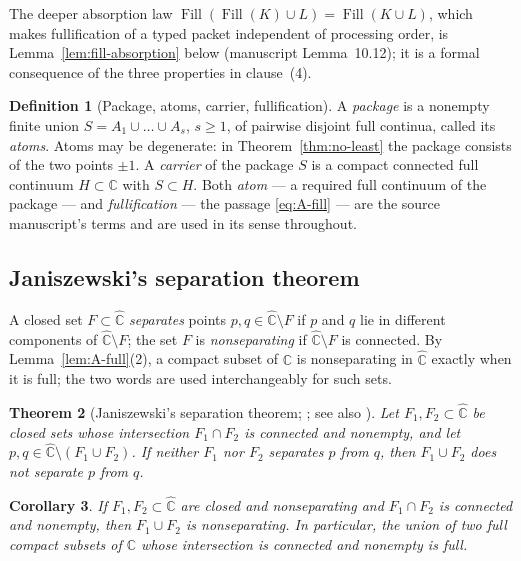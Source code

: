 \documentclass[11pt,reqno]{amsart}
\newtheorem{theorem}{Theorem}[section]
\newtheorem{corollary}[theorem]{Corollary}
\theoremstyle{definition}
\newtheorem{definition}[theorem]{Definition}
\theoremstyle{remark}
\newcommand{\C}{\mathbb C}
\newcommand{\Chat}{\widehat{\mathbb C}}
\newcommand{\Fill}{\operatorname{Fill}}
\begin{document}
The deeper absorption law
$\Fill(\Fill(K)\cup L)=\Fill(K\cup L)$, which makes fullification of a
typed packet independent of processing order, is
Lemma~\ref{lem:fill-absorption} below (manuscript Lemma~10.12); it is a
formal consequence of the three properties in clause~(4).

\begin{definition}[Package, atoms, carrier, fullification]
\label{def:A-package}
A \emph{package} is a nonempty finite union
$S=A_1\cup\dots\cup A_s$, $s\ge1$, of pairwise disjoint full continua,
called its \emph{atoms}.  Atoms may be
degenerate: in Theorem~\ref{thm:no-least} the package consists of the two
points $\pm1$.  A \emph{carrier} of the package $S$ is a compact
connected full continuum $H\subset\C$ with $S\subset H$.  Both
\emph{atom} --- a required full continuum of the package --- and
\emph{fullification} --- the passage \eqref{eq:A-fill} --- are the source
manuscript's terms \cite{MWman} and are used in its sense throughout.
\end{definition}

\subsection{Janiszewski's separation theorem}\label{subsec:A-janiszewski}

A closed set $F\subset\Chat$ \emph{separates} points
$p,q\in\Chat\setminus F$ if $p$ and $q$ lie in different components of
$\Chat\setminus F$; the set $F$ is \emph{nonseparating} if
$\Chat\setminus F$ is connected.  By Lemma~\ref{lem:A-full}(2), a compact
subset of $\C$ is nonseparating in $\Chat$ exactly when it is full; the
two words are used interchangeably for such sets.

\begin{theorem}[Janiszewski's separation theorem;
{\cite{Jan15}; see also \cite{New51,Why42}}]
\label{thm:A-janiszewski}
Let $F_1,F_2\subset\Chat$ be closed sets whose intersection
$F_1\cap F_2$ is connected and nonempty, and let
$p,q\in\Chat\setminus(F_1\cup F_2)$.  If neither $F_1$ nor $F_2$
separates $p$ from $q$, then $F_1\cup F_2$ does not separate $p$ from
$q$.
\end{theorem}

\begin{corollary}\label{cor:A-janiszewski}
If $F_1,F_2\subset\Chat$ are closed and nonseparating and
$F_1\cap F_2$ is connected and nonempty, then $F_1\cup F_2$ is
nonseparating.  In particular, the union of two full compact subsets of
$\C$ whose intersection is connected and nonempty is full.
\end{corollary}
\end{document}
